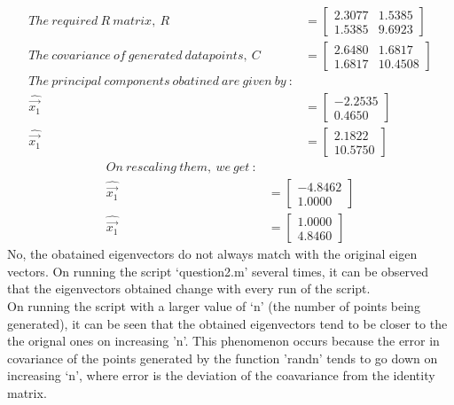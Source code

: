\documentclass[a4paper,fleqn,11pt]{article}
\theoremstyle{mytheor}
\begin{document}
\begin{align*}
The\ required\ R\ matrix,\ R & = \begin{bmatrix}
									2.3077 & 1.5385 \\
									1.5385 & 9.6923
							 	  \end{bmatrix} \\
The\ covariance\ of\ generated\ datapoints,\ C & = \begin{bmatrix}
														2.6480 & 1.6817 \\
														1.6817 & 10.4508
												    \end{bmatrix} \\
The\ principal\ components\ obatined\ are\ given\ by\ : \\
\hat{\overrightarrow{x_1}} & = \begin{bmatrix}
						-2.2535 \\
						 0.4650
					 \end{bmatrix} \\
\hat{\overrightarrow{x_1}} &  = \begin{bmatrix}
									 2.1822 \\
									10.5750
					   			 \end{bmatrix}
\end{align*}
\begin{align*}
On\ rescaling\ them,\ we\ get\ : \\
\hat{\overrightarrow{x_1}} & = \begin{bmatrix}
									-4.8462 \\
									 1.0000
					  			\end{bmatrix} \\
\hat{\overrightarrow{x_1}} &  = \begin{bmatrix}
									1.0000 \\
									4.8460
					   			 \end{bmatrix}
\end{align*}
No, the obatained eigenvectors do not always match with the original eigen vectors. On running the script `question2.m' several times, it can be observed that the eigenvectors obtained change with every run of the script. \\
On running the script with a larger value of `n' (the number of points being generated), it can be seen that the obtained eigenvectors tend to be closer to the the orignal ones on increasing 'n'. This phenomenon occurs because the error in covariance of the points generated by the function 'randn' tends to go down on increasing `n', where error is the deviation of the coavariance from the identity matrix.
\end{document}
